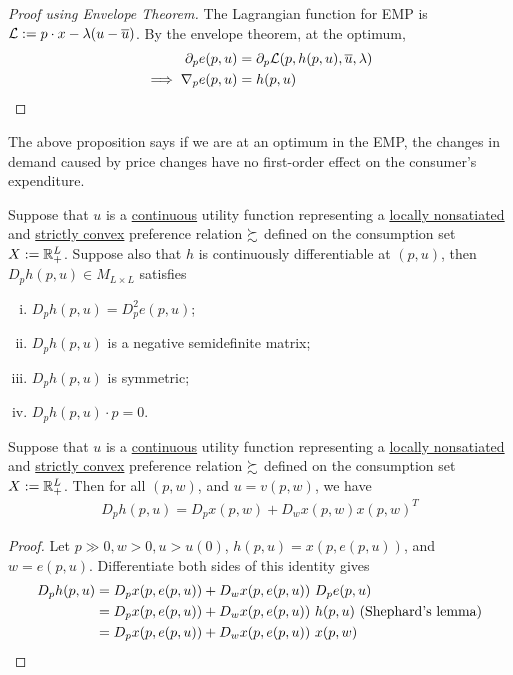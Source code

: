 \documentclass{article}
\begin{document}
 			\begin{proof}[Proof using Envelope Theorem]
 				The Lagrangian function for EMP is $\mathcal{{L}} := p \cdot x - \lambda (u - \overline{u})$. By the envelope theorem, at the optimum, 
 				\begin{align}
 					\partial_p e(p, u) &= \partial_p \mathcal{{L}}(p, h(p, u), \overline{u}, \lambda) \\
 					\implies \nabla_p e(p, u) &= h(p, u)
 				\end{align}
 			\end{proof}
 			
 			\begin{remark}[Interpretation]
 				The above proposition says if we are at an optimum in the EMP, the changes in demand caused by price changes have no first-order effect on the consumer's expenditure.
 			\end{remark}
 			
 			\begin{proposition}[3.G.2]
 				Suppose that $u$ is a \ul{continuous} utility function representing a \ul{locally nonsatiated} and \ul{strictly convex} preference relation $\succsim$ defined on the consumption set $X := \mathbb{R}^L_+$. Suppose also that $h$ is continuously differentiable at $(p, u)$, then $D_p h(p, u) \in M_{L \times L}$ satisfies
 				\begin{enumerate}[(i)]
 					\item $D_{p} h(p, u)=D_{p}^{2} e(p, u)$;
 					\item $D_p h(p, u)$ is a negative semidefinite matrix;
 					\item $D_p h(p, u)$ is symmetric;
 					\item $D_p h(p, u) \cdot p = 0$.
 				\end{enumerate}
 			\end{proposition}
 			
 			\begin{proposition}
 				Suppose that $u$ is a \ul{continuous} utility function representing a \ul{locally nonsatiated} and \ul{strictly convex} preference relation $\succsim$ defined on the consumption set $X := \mathbb{R}^L_+$. Then for all $(p, w)$, and $u=v(p, w)$, we have
 				\begin{align}
 					D_{p} h(p, u)=D_{p} x(p, w)+D_{w} x(p, w) x(p, w)^{T}
 				\end{align}
 			\end{proposition}
 			
 			\begin{proof}
 				Let $p \gg 0, w > 0, u > u(0)$, $h(p, u) = x(p, e(p, u))$, and $w = e(p, u)$. Differentiate both sides of this identity gives
 				\begin{align}
 					D_p h(p,u) &= D_p x(p, e(p,u)) + D_w x(p, e(p,u))\ D_p e(p, u) \\
 					&= D_p x(p, e(p,u)) + D_w x(p, e(p,u))\ h(p, u) \text{{ (Shephard's lemma)}} \\
 					&= D_p x(p, e(p,u)) + D_w x(p, e(p,u))\ x(p, w)
 				\end{align}
 			\end{proof}
 			
\end{document}
